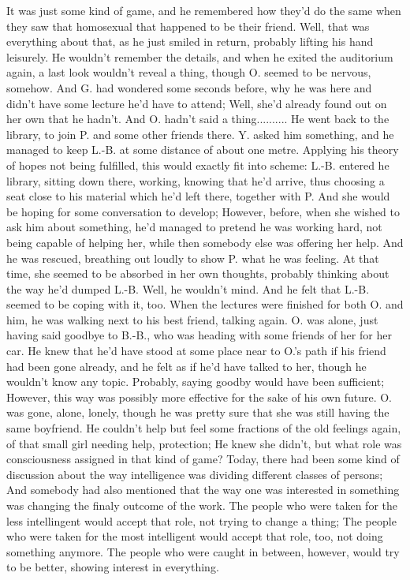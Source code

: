 It was just some kind of game, and he remembered how they'd do the same when they saw that homosexual that happened to be their friend. 
Well, that was everything about that, as he just smiled in return, probably lifting his hand leisurely. He wouldn't remember the details, and when he exited the auditorium again, a last look wouldn't reveal a thing, though O. seemed to be nervous, somehow. 
And G. had wondered  some seconds before, why he was here and didn't have some lecture he'd have to attend; Well, she'd already found out on her own that he hadn't. 
And O. hadn't said a thing..........
He went back to the library, to join P. and some other friends there. 
Y. asked him something, and he managed to keep L.-B. at some distance of about one metre. Applying his theory of hopes not being fulfilled, this would exactly fit into scheme: L.-B. entered he library, sitting down there, working, knowing that he'd arrive, thus choosing a seat close to his material which he'd left there, together with P. And she would be hoping for some conversation to develop; However, before, when she wished to ask him about something, he'd managed to pretend he was working hard, not being capable of helping her, while then somebody else was offering her help. And he was rescued, breathing out loudly to show P. what he was feeling. At that time, she seemed to be absorbed in her own thoughts, probably thinking about the way he'd dumped L.-B. Well, he wouldn't mind. And he felt that L.-B. seemed to be coping with it, too. 
When the lectures were finished for both O. and him, he was walking next to his best friend, talking again. O. was alone, just having said goodbye to B.-B., who was heading with some friends of her for her car. He knew that he'd have stood at some place near to O.'s path if his friend had been gone already, and he felt as if he'd have talked to her, though he wouldn't know any topic. Probably, saying goodby would have been sufficient; However, this way was possibly more effective for the sake of his own future. 
O. was gone, alone, lonely, though he was pretty sure that she was still having the same boyfriend. He couldn't help but feel some fractions of the old feelings again, of that small girl needing help, protection; He knew she didn't, but what role was consciousness assigned in that kind of game?
Today, there had been some kind of discussion about the way intelligence was dividing different classes of persons; And somebody had also mentioned that the way one was interested in something was changing the finaly outcome of the work. The people who were taken for the less intellingent would accept that role, not trying to change a thing; The people who were taken for the most intelligent would accept that role, too, not doing something anymore. The people who were caught in between, however, would try to be better, showing interest in everything. 
